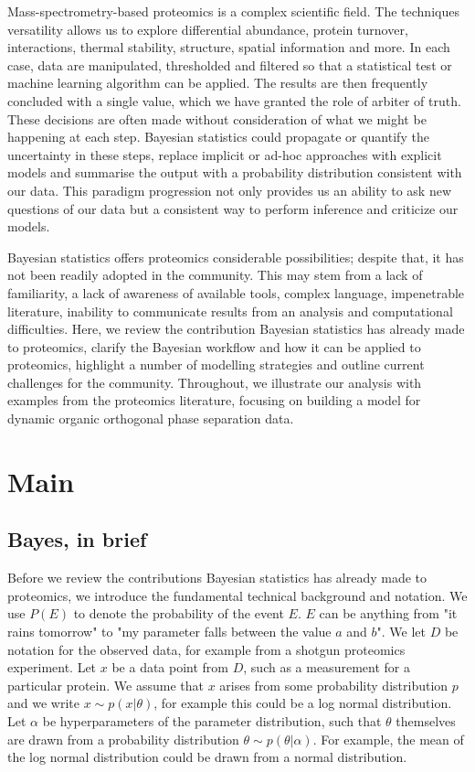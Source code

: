 \documentclass[12pt,english]{article}
\begin{document}
Mass-spectrometry-based proteomics is a complex scientific field. The techniques versatility allows us to explore differential abundance, protein turnover, interactions, thermal stability, structure, spatial information and more. In each case, data are manipulated, thresholded and filtered so that a statistical test or machine learning algorithm can be applied. The results are then frequently concluded with a single value, which we have granted the role of arbiter of truth. These decisions are often made without consideration of what we might be happening at each step. Bayesian statistics could propagate or quantify the uncertainty in these steps, replace implicit or ad-hoc approaches with explicit models and summarise the output with a probability distribution consistent with our data. This paradigm progression not only provides us an ability to ask new questions of our data but a consistent way to perform inference and criticize our models. 

Bayesian statistics offers proteomics considerable possibilities; despite that, it has not been readily adopted in the community. This may stem from a lack of familiarity, a lack of awareness of available tools, complex language, impenetrable literature, inability to communicate results from an analysis and computational difficulties. Here, we review the contribution Bayesian statistics has already made to proteomics, clarify the Bayesian workflow and how it can be applied to proteomics, highlight a number of modelling strategies and outline current challenges for the community. Throughout, we illustrate our analysis with examples from the proteomics literature, focusing on building a model for dynamic organic orthogonal phase separation data.
\section{Main}
\subsection{Bayes, in brief}
Before we review the contributions Bayesian statistics has already made to proteomics, we introduce the fundamental technical background and notation. We use $P(E)$ to denote the probability of the event $E$. $E$ can be anything from "it rains tomorrow" to "my parameter falls between the value $a$ and $b$". We let $D$ be notation for the observed data, for example from a shotgun proteomics experiment. Let $x$ be a data point from $D$, such as a measurement for a particular protein. We assume that $x$ arises from some probability distribution $p$ and we write $x \sim p(x|\theta)$, for example this could be a log normal distribution. Let $\alpha$ be hyperparameters of the parameter distribution, such that $\theta$ themselves are drawn from a probability distribution $\theta \sim p(\theta|\alpha)$. For example, the mean of the log normal distribution could be drawn from a normal distribution. 
\end{document}
